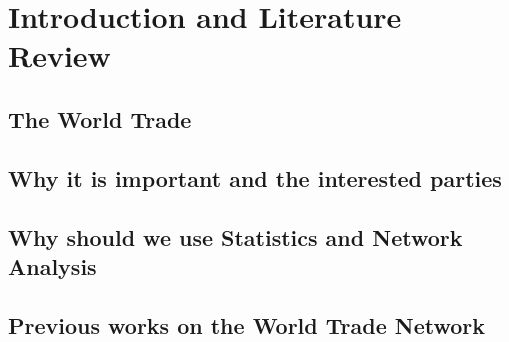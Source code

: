 \chapter{Introduction and Literature Review}

\section{The World Trade}
\section{Why it is important and the interested parties}
\section{Why should we use Statistics and Network Analysis}
\section{Previous works on the World Trade Network}






